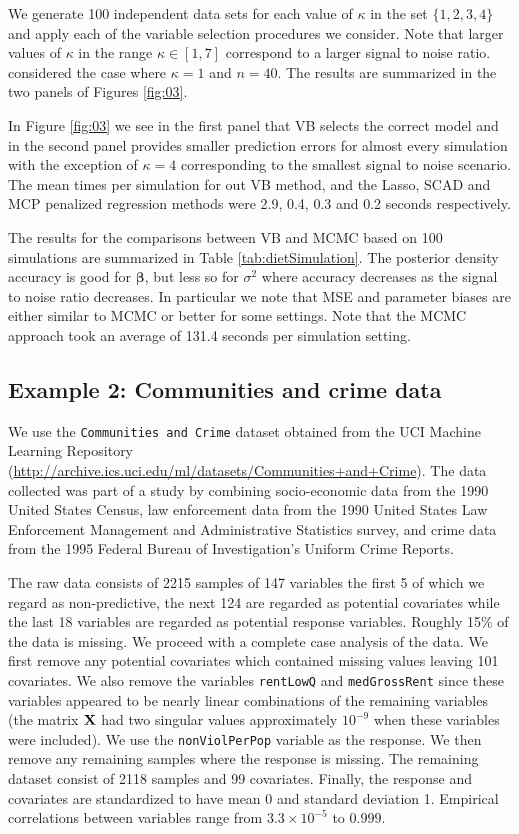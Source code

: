 \documentclass[11pt]{article}
\newtheorem{Main Result}{Main Result}
\def\vectorfonttwo{\boldsymbol}
\def\vbeta{{\vectorfonttwo \beta}}               %
\def\matrixfontone{\bf}
\def\mX{{\matrixfontone X}}                      %
\newcommand{\joc}[1]{{\color{black}#1}}
\begin{document}
We generate 100 independent data sets for each value of $\kappa$ in the set
$\{ 1,2,3,4\}$ and apply each of the variable selection procedures we consider.
Note that larger values of $\kappa$ in the range $\kappa\in[1,7]$ correspond to a larger
signal to noise ratio. \cite{Garcia2013} considered the case where $\kappa=1$
and $n=40$. The results are summarized in the two panels of Figures \ref{fig:03}.

In Figure \ref{fig:03} we see in the first panel that VB selects the correct model
and in the second panel provides smaller prediction errors for almost every simulation 
with the exception of $\kappa=4$ corresponding to the smallest signal to noise scenario. 
The mean times per simulation for out VB method, and the Lasso, SCAD and MCP penalized 
regression methods were 2.9, 0.4, 0.3 and 0.2 seconds respectively.




 

The results for the comparisons between VB and MCMC
based on 100 simulations are summarized in Table
\ref{tab:dietSimulation}. \joc{The posterior density  accuracy
is good for $\vbeta$, but less so for $\sigma^2$ where accuracy decreases
as the signal to noise ratio decreases.} In particular
we note that MSE and parameter biases are either similar to MCMC
or better for some settings.
Note that the MCMC approach took an average
of 131.4 seconds per simulation setting. 

 
\subsection{Example 2: Communities and crime data}

  
We use the {\tt Communities and Crime} dataset obtained from the
UCI Machine Learning Repository   (\url{http://archive.ics.uci.edu/ml/datasets/Communities+and+Crime}). The data collected was part
of a study by \cite{Redmond2002} combining socio-economic data
from the 1990 United States Census, law enforcement data from the 1990 United States Law Enforcement Management and Administrative
Statistics
survey, and crime data from the 1995 Federal Bureau of Investigation's Uniform
Crime Reports.

The raw data consists of 2215 samples of 147 variables the first 5 of which
we regard as non-predictive, the next 124 are regarded as potential
covariates while the last 18 variables are regarded as potential response
variables. Roughly 15\% of the data is missing. We proceed with a complete
case analysis of the data.
We first remove any potential covariates which contained missing values leaving
101 covariates. We also remove the variables {\tt rentLowQ} and
{\tt medGrossRent} since these variables appeared to be nearly linear
combinations of the remaining variables (the matrix $\mX$ had two singular
values approximately $10^{-9}$ when these variables were included).  We use the
{\tt nonViolPerPop} variable as the response. We then remove any remaining
samples where the response is missing. The remaining dataset consist of 2118
samples and 99 covariates. Finally, the response and covariates are
standardized to have mean 0 and standard deviation 1. \joc{Empirical correlations
	between variables range from $3.3\times10^{-5}$ to $0.999$.}
\end{document}
